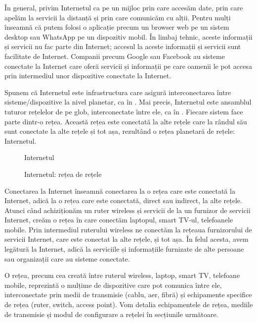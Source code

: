 În general, privim Internetul ca pe un mijloc prin care accesăm date, prin care apelăm la servicii la distanță și prin care comunicăm cu alții.
Pentru mulți înseamnă că putem folosi o aplicație precum un browser web pe un sistem desktop sau WhatsApp pe un dispozitiv mobil.
În limbaj tehnic, aceste informații și servicii nu fac parte din Internet;
accesul la aceste informații și servicii sunt facilitate de Internet.
Companii precum Google sau Facebook au sisteme conectate la Internet care oferă servicii și informații pe care oamenii le pot accesa prin intermediul unor dispozitive conectate la Internet.

Spunem că Internetul este infrastructura care asigură interconectarea între sisteme/dispozitive la nivel planetar, ca în .
Mai precis, Internetul este ansamblul tuturor rețelelor de pe glob, interconectate între ele, ca în .
Fiecare sistem face parte dintr-o rețea.
Această rețea este conectată la alte rețele care la rândul său sunt conectate la alte rețele și tot așa, rezultând o rețea planetară de rețele: Internetul.

\begin{figure}[htbp]
  \centering
  \def\svgwidth{\columnwidth}
  
  \caption{Internetul}
  \label{fig:net:internet}
\end{figure}

\begin{figure}[htbp]
  \centering
  \def\svgwidth{\columnwidth}
  
  \caption{Internetul: rețea de rețele}
  \label{fig:net:internet-as-network}
\end{figure}

Conectarea la Internet înseamnă conectarea la o rețea care este conectată la Internet, adică la o rețea care este conectată, direct sau indirect, la alte rețele.
Atunci când achiziționăm un ruter wireless și servicii de la un furnizor de servicii Internet, creăm o rețea în care conectăm laptopul, smart TV-ul, telefoanele mobile.
Prin intermediul ruterului wireless ne conectăm la rețeaua furnizorului de servicii Internet, care este conectat la alte rețele, și tot așa.
În felul acesta, avem legătură la Internet, adică la serviciile și informațiile furnizate de alte persoane sau organizații care au sisteme conectate.

O rețea, precum cea creată între ruterul wireless, laptop, smart TV, telefoane mobile, reprezintă o mulțime de dispozitive care pot comunica între ele, interconectate prin medii de transmisie (cablu, aer, fibră) și echipamente specifice de rețea (ruter, switch, access point).
Vom detalia echipamentele de rețea, mediile de transmisie și modul de configurare a rețelei în secțiunile următoare.

